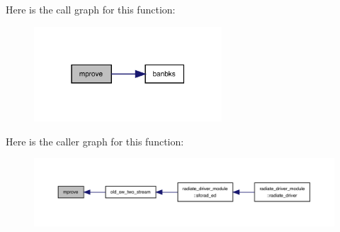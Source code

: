 Here is the call graph for this function\+:
\nopagebreak
\begin{figure}[H]
\begin{center}
\leavevmode
\includegraphics[width=199pt]{old__twostream__rad_8f90_a4706dfdfc064dbcb59617aad9d555474_cgraph}
\end{center}
\end{figure}
Here is the caller graph for this function\+:
\nopagebreak
\begin{figure}[H]
\begin{center}
\leavevmode
\includegraphics[width=350pt]{old__twostream__rad_8f90_a4706dfdfc064dbcb59617aad9d555474_icgraph}
\end{center}
\end{figure}
\mbox{\label{old__twostream__rad_8f90_a23245b8d2ae882776ded0e620001a021}} 

